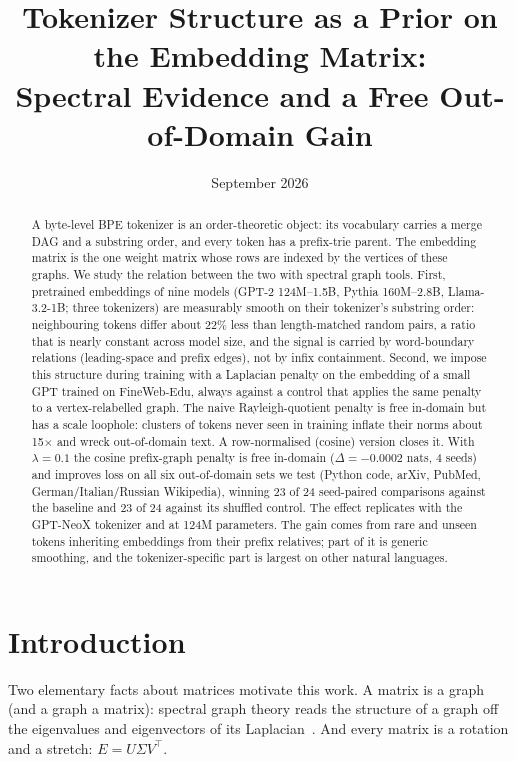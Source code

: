 \documentclass[11pt]{article}
\title{Tokenizer Structure as a Prior on the Embedding Matrix:\\
\large Spectral Evidence and a Free Out-of-Domain Gain}
\author{\theauthor}
\date{September 2026}
\begin{document}
\maketitle

\begin{abstract}
A byte-level BPE tokenizer is an order-theoretic object: its vocabulary carries a
merge DAG and a substring order, and every token has a prefix-trie parent. The
embedding matrix is the one weight matrix whose rows are indexed by the vertices of
these graphs. We study the relation between the two with spectral graph tools.
First, pretrained embeddings of nine models (GPT-2 124M--1.5B, Pythia 160M--2.8B,
Llama-3.2-1B; three tokenizers) are measurably smooth on their tokenizer's
substring order: neighbouring tokens differ about 22\% less than length-matched
random pairs, a ratio that is nearly constant across model size, and the signal is
carried by word-boundary relations (leading-space and prefix edges), not by infix
containment. Second, we impose this structure during training with a Laplacian
penalty on the embedding of a small GPT trained on FineWeb-Edu, always against a
control that applies the same penalty to a vertex-relabelled graph. The naive
Rayleigh-quotient penalty is free in-domain but has a scale loophole: clusters of
tokens never seen in training inflate their norms about 15$\times$ and wreck
out-of-domain text. A row-normalised (cosine) version closes it. With
$\lambda=0.1$ the cosine prefix-graph penalty is free in-domain
($\Delta=-0.0002$ nats, 4 seeds) and improves loss on all six out-of-domain sets we
test (Python code, arXiv, PubMed, German/Italian/Russian Wikipedia), winning 23 of
24 seed-paired comparisons against the baseline and 23 of 24 against its shuffled
control. The effect replicates with the GPT-NeoX tokenizer and at 124M parameters.
The gain comes from rare and unseen tokens inheriting embeddings from their prefix
relatives; part of it is generic smoothing, and the tokenizer-specific part is
largest on other natural languages.
\end{abstract}

\section{Introduction}

Two elementary facts about matrices motivate this work. A matrix is a graph (and a
graph a matrix): spectral graph theory reads the structure of a graph off the
eigenvalues and eigenvectors of its Laplacian~\cite{chung1997}. And every matrix is
a rotation and a stretch: $E=U\Sigma V^\top$.
\end{document}
